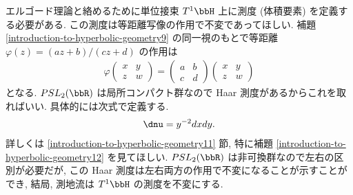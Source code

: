 \documentclass[openany, a4paper, oneside]{jsbook}
\begin{document}
エルゴード理論と絡めるために単位接束 $T^1 \bbH$ 上に測度 (体積要素) を定義する必要がある.
この測度は等距離写像の作用で不変であってほしい.
補題 \ref{introduction-to-hyperbolic-geometry9} の同一視のもとで等距離 $\varphi (z) = (az + b) / (cz + d)$ の作用は
\begin{align}
 \varphi
 \begin{pmatrix}
  x & y \\
  z & w
 \end{pmatrix}
 =
 \begin{pmatrix}
  a & b \\
  c & d
 \end{pmatrix}
 \begin{pmatrix}
  x & y \\
  z & w
 \end{pmatrix}
\end{align}
となる.
$PSL_2(\bbR)$ は局所コンパクト群なので Haar 測度があるからこれを取ればいい.
具体的には次式で定義する.
\begin{align}
 \dnu  = y^{-2} dx dy.
\end{align}
詳しくは \ref{introduction-to-hyperbolic-geometry11} 節,
特に補題 \ref{introduction-to-hyperbolic-geometry12} を見てほしい.
$PSL_2(\bbR)$ は非可換群なので左右の区別が必要だが,
この Haar 測度は左右両方の作用で不変になることが示すことができ,
結局, 測地流は $T^1 \bbH$ の測度を不変にする.
\end{document}
